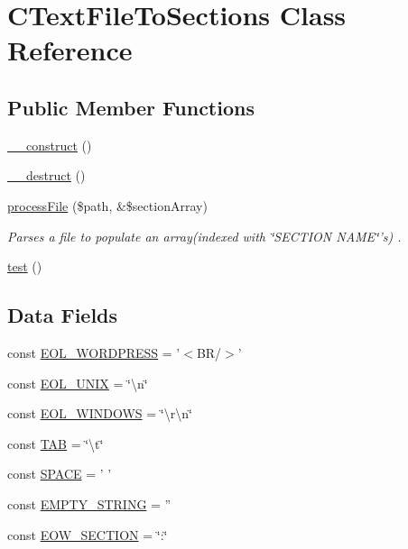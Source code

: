 \hypertarget{class_c_text_file_to_sections}{\section{C\+Text\+File\+To\+Sections Class Reference}
\label{class_c_text_file_to_sections}
}
\subsection*{Public Member Functions}
\begin{DoxyCompactItemize}
\item 
\hyperlink{class_c_text_file_to_sections_a095c5d389db211932136b53f25f39685}{\+\_\+\+\_\+construct} ()
\item 
\hyperlink{class_c_text_file_to_sections_a421831a265621325e1fdd19aace0c758}{\+\_\+\+\_\+destruct} ()
\item 
\hyperlink{class_c_text_file_to_sections_ae719873c3d10bcf0f0727bfe08d06f1a}{process\+File} (\$path, \&\$section\+Array)
\begin{DoxyCompactList}\small\item\em Parses a file to populate an array(indexed with \char`\"{}\+S\+E\+C\+T\+I\+O\+N N\+A\+M\+E\char`\"{}'s) . \end{DoxyCompactList}\item 
\hyperlink{class_c_text_file_to_sections_ad69dd4607977cae05ebe19d1ae604fb1}{test} ()
\end{DoxyCompactItemize}
\subsection*{Data Fields}
\begin{DoxyCompactItemize}
\item 
const \hyperlink{class_c_text_file_to_sections_ab42c9508f4a6cafdb958dfc768b4b35f}{E\+O\+L\+\_\+\+W\+O\+R\+D\+P\+R\+E\+S\+S} = '$<$B\+R/$>$'
\item 
const \hyperlink{class_c_text_file_to_sections_ae0d7cc0854f7f23e9cfd8f31669cb8a6}{E\+O\+L\+\_\+\+U\+N\+I\+X} = \char`\"{}\textbackslash{}n\char`\"{}
\item 
const \hyperlink{class_c_text_file_to_sections_a2ed1440aee0a360f2f79b5cbff5a9725}{E\+O\+L\+\_\+\+W\+I\+N\+D\+O\+W\+S} = \char`\"{}\textbackslash{}r\textbackslash{}n\char`\"{}
\item 
const \hyperlink{class_c_text_file_to_sections_a4383af7457a1680a60c012aebc4d9dac}{T\+A\+B} = \char`\"{}\textbackslash{}t\char`\"{}
\item 
const \hyperlink{class_c_text_file_to_sections_a80547d19853b375decb59c8851e2be8e}{S\+P\+A\+C\+E} = ' '
\item 
const \hyperlink{class_c_text_file_to_sections_a3ea64c0a47c070d0ccf0f32e544ce418}{E\+M\+P\+T\+Y\+\_\+\+S\+T\+R\+I\+N\+G} = ''
\item 
const \hyperlink{class_c_text_file_to_sections_ac11b7048c1ff14deb5078834c86485d1}{E\+O\+W\+\_\+\+S\+E\+C\+T\+I\+O\+N} = \char`\"{}\+:\char`\"{}
\end{DoxyCompactItemize}
